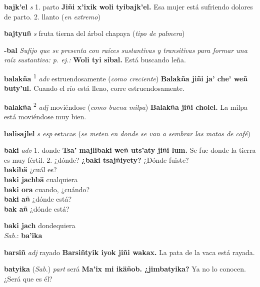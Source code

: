 \documentclass[10pt]{scrbook}
\newcommand{\entry}[1]{\textbf{#1}}
\newcommand{\onedefinition}[1]{#1.}
\newcommand{\defsuperscript}[1]{\textsuperscript{#1}}
\newcommand{\nontranslationdef}[1]{\textit{#1}}
\newcommand{\partofspeech}[1]{\textit{#1}}
\newcommand{\spanishtranslation}[1]{#1}
\newcommand{\clarification}[1]{(\textit{#1})}
\newcommand{\cholexample}[1]{\textbf{#1}}
\newcommand{\exampletranslation}[1]{#1}
\newcommand{\dialectvariant}[1]{\\\textit{#1}:}
\newcommand{\dialectword}[1]{\textbf{#1}}
\newcommand{\relevantdialect}[1]{(\textit{#1})}
\newcommand{\secondaryentry}[1]{\\\textbf{#1}}
\newcommand{\secondtranslation}[1]{#1}
\begin{document}
\begin{multicols}{2}
\entry{bajk'el}
\partofspeech{s}
\onedefinition{1}
\spanishtranslation{parto}
\cholexample{Jiñi x'ixik woli tyibajk'el.}
\exampletranslation{Esa mujer está sufriendo dolores de parto.}
\onedefinition{2}
\spanishtranslation{llanto}
\clarification{en extremo}

\entry{bajtyuñ}
\partofspeech{s}
\spanishtranslation{fruta tierna del árbol chapaya}
\clarification{tipo de palmera}

\entry{-bal}
\nontranslationdef{Sufijo que se presenta con raíces sustantivas y transitivas para formar una raíz sustantiva: p. ej.:}
\cholexample{Woli tyi sibal.}
\exampletranslation{Está buscando leña.}

\entry{balakña}
\defsuperscript{1}
\partofspeech{adv}
\spanishtranslation{estruendosamente}
\clarification{como creciente}
\cholexample{Balakña jiñi ja' che' weñ buty'ul.}
\exampletranslation{Cuando el río está lleno, corre estruendosamente.}

\entry{balakña}
\defsuperscript{2}
\partofspeech{adj}
\spanishtranslation{moviéndose}
\clarification{como buena milpa}
\cholexample{Balakña jiñi cholel.}
\exampletranslation{La milpa está moviéndose muy bien.}

\entry{balisajlel}
\partofspeech{s esp}
\spanishtranslation{estacas}
\clarification{se meten en donde se van a sembrar las matas de café}

\entry{baki}
\partofspeech{adv}
\onedefinition{1}
\spanishtranslation{donde}
\cholexample{Tsa' majlibaki weñ uts'aty jiñi lum.}
\exampletranslation{Se fue donde la tierra es muy fértil.}
\onedefinition{2}
\spanishtranslation{¿dónde?}
\cholexample{¿baki tsajñiyety?}
\exampletranslation{¿Dónde fuiste?}
\secondaryentry{bakibä}
\secondtranslation{¿cuál es?}
\secondaryentry{baki jachbä}
\secondtranslation{cualquiera}
\secondaryentry{baki ora}
\secondtranslation{cuando, ¿cuándo?}
\secondaryentry{baki añ}
\secondtranslation{¿dónde está?}
\secondaryentry{bak añ}
\secondtranslation{¿dónde está?}

\entry{baki jach}
\spanishtranslation{dondequiera}
\dialectvariant{Sab.}
\dialectword{ba'ika}

\entry{barsiñ}
\partofspeech{adj}
\spanishtranslation{rayado}
\cholexample{Barsiñtyik iyok jiñi wakax.}
\exampletranslation{La pata de la vaca está rayada.}

\entry{batyika}
\relevantdialect{Sab.}
\partofspeech{part}
\spanishtranslation{será}
\cholexample{Ma'ix mi ikäñob. ¿jimbatyika?}
\exampletranslation{Ya no lo conocen. ¿Será que es él?}


\end{multicols}
\end{document}
